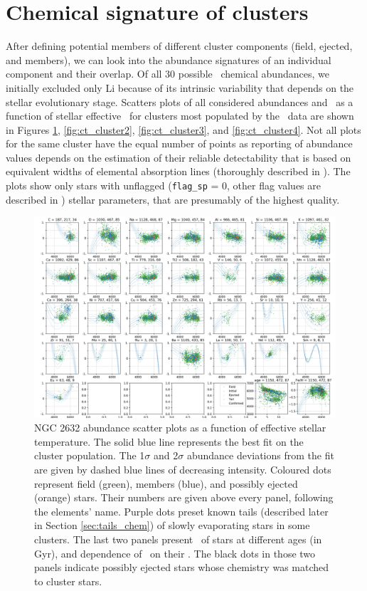 \section{Chemical signature of clusters}
\label{sec:chem_cluster}
After defining potential members of different cluster components (field, ejected, and members), we can look into the abundance signatures of an individual component and their overlap. Of all 30 possible \Gh\ chemical abundances, we initially excluded only Li because of its intrinsic variability that depends on the stellar evolutionary stage. Scatters plots of all considered abundances and \Feh\ as a function of stellar effective \Teff\ for clusters most populated by the \Gh\ data are shown in Figures \ref{fig:ct_cluster1}, \ref{fig:ct_cluster2}, \ref{fig:ct_cluster3}, and \ref{fig:ct_cluster4}. Not all plots for the same cluster have the equal number of points as reporting of abundance values depends on the estimation of their reliable detectability that is based on equivalent widths of elemental absorption lines (thoroughly described in \citet{buder2020}). The plots show only stars with unflagged (\texttt{flag\_sp} = 0, other flag values are described in \citet{buder2020}) stellar parameters, that are presumably of the highest quality.

\begin{figure}
	\centering
	\includegraphics[width=\textwidth]{p_teff_abundances_NGC_2682_orbits_DR3_new_flag0.png}
	\caption{NGC 2632 abundance scatter plots as a function of effective stellar temperature. The solid blue line represents the best fit on the cluster population. The 1$\sigma$ and 2$\sigma$ abundance deviations from the fit are given by dashed blue lines of decreasing intensity. Coloured dots represent field (green), members (blue), and possibly ejected (orange) stars. Their numbers are given above every panel, following the elements' name. Purple dots preset known tails (described later in Section \ref{sec:tails_chem}) of slowly evaporating stars in some clusters. The last two panels present \Teff\ of stars at different ages (in Gyr), and dependence of \Feh\ on their \Teff. The black dots in those two panels indicate possibly ejected stars whose chemistry was matched to cluster stars.}
	\label{fig:ct_cluster1}
\end{figure}

